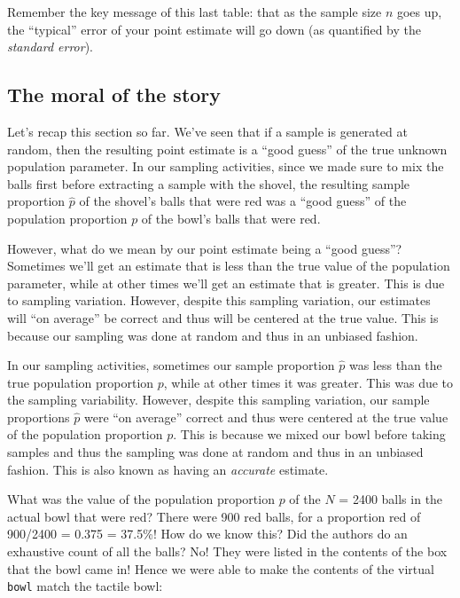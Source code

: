 \documentclass[
]{book}
\begin{document}
Remember the key message of this last table: that as the sample size \(n\) goes up, the ``typical'' error of your point estimate will go down (as quantified by the \emph{standard error}).

\hypertarget{moral-of-the-story}{%
\subsection{The moral of the story}\label{moral-of-the-story}}

Let's recap this section so far. We've seen that if a sample is generated at random, then the resulting point estimate is a ``good guess'' of the true unknown population parameter. In our sampling activities, since we made sure to mix the balls first before extracting a sample with the shovel, the resulting sample proportion \(\widehat{p}\) of the shovel's balls that were red was a ``good guess'' of the population proportion \(p\) of the bowl's balls that were red.

However, what do we mean by our point estimate being a ``good guess''? Sometimes we'll get an estimate that is less than the true value of the population parameter, while at other times we'll get an estimate that is greater. This is due to sampling variation. However, despite this sampling variation, our estimates will ``on average'' be correct and thus will be centered at the true value. This is because our sampling was done at random and thus in an unbiased fashion.

In our sampling activities, sometimes our sample proportion \(\widehat{p}\) was less than the true population proportion \(p\), while at other times it was greater. This was due to the sampling variability. However, despite this sampling variation, our sample proportions \(\widehat{p}\) were ``on average'' correct and thus were centered at the true value of the population proportion \(p\). This is because we mixed our bowl before taking samples and thus the sampling was done at random and thus in an unbiased fashion. This is also known as having an \emph{accurate} estimate.

What was the value of the population proportion \(p\) of the \(N\) = 2400 balls in the actual bowl that were red? There were 900 red balls, for a proportion red of 900/2400 = 0.375 = 37.5\%! How do we know this? Did the authors do an exhaustive count of all the balls? No! They were listed in the contents of the box that the bowl came in! Hence we were able to make the contents of the virtual \texttt{bowl} match the tactile bowl:
\end{document}
